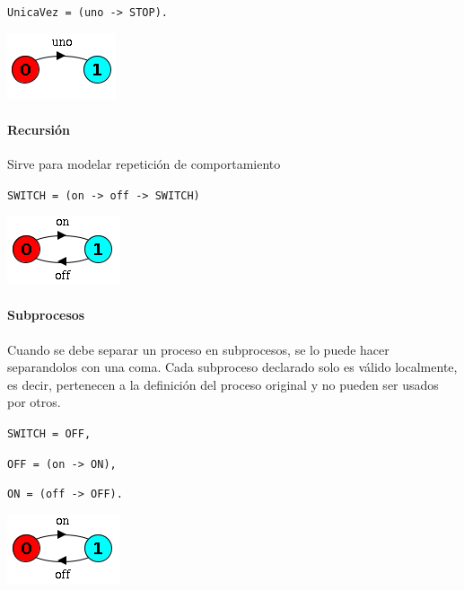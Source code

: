 \begin{center}
\begin{minipage}{0.35\textwidth}
\texttt{UnicaVez = (uno -> STOP).}
\end{minipage}
\begin{minipage}{0.35\textwidth}
	\includegraphics[scale=1]{imagenes/lts-uno}
\end{minipage}
\end{center}

\paragraph{Recursión}
Sirve para modelar repetición de comportamiento
\begin{center}
\begin{minipage}{0.45\textwidth}
\texttt{SWITCH = (on -> off -> SWITCH)}
\end{minipage}
\begin{minipage}{0.415\textwidth}
	\includegraphics[scale=1]{imagenes/lts-switch}
\end{minipage}
\end{center}

\paragraph{Subprocesos} 
Cuando se debe separar un proceso en subprocesos, se lo puede hacer separandolos con una coma. Cada subproceso declarado solo es válido localmente, es decir, pertenecen a la definición del proceso original y no pueden ser usados por otros.
\begin{center}
\begin{minipage}{0.25\textwidth}
\texttt{SWITCH = OFF,}

\texttt{OFF    = (on -> ON),}

\texttt{ON     = (off -> OFF).}

\end{minipage}
\begin{minipage}{0.25\textwidth}
	\includegraphics[scale=1]{imagenes/lts-switch}
\end{minipage}
\end{center}

